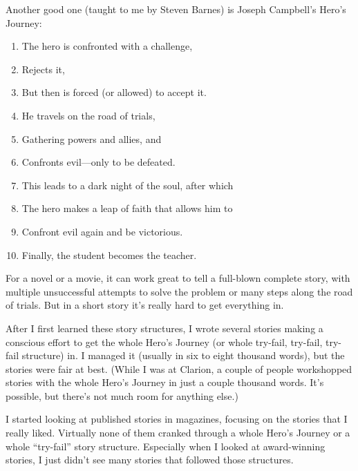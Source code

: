 \documentclass[openleft,oneside,showtrims]{memoir}
\begin{document}
Another good one (taught to me by Steven Barnes) is Joseph Campbell’s Hero’s Journey:

\begin{enumerate}
\item The hero is confronted with a challenge,

\item Rejects it,

\item But then is forced (or allowed) to accept it.

\item He travels on the road of trials,

\item Gathering powers and allies, and

\item Confronts evil—only to be defeated.

\item This leads to a dark night of the soul, after which

\item The hero makes a leap of faith that allows him to

\item Confront evil again and be victorious.

\item Finally, the student becomes the teacher.
\end{enumerate}

For a novel or a movie, it can work great to tell a full-blown complete story, with multiple unsuccessful attempts to solve the problem or many steps along the road of trials. But in a short story it’s really hard to get everything in.

After I first learned these story structures, I wrote several stories making a conscious effort to get the whole Hero’s Journey (or whole try-fail, try-fail, try-fail structure) in. I managed it (usually in six to eight thousand words), but the stories were fair at best. (While I was at Clarion, a couple of people workshopped stories with the whole Hero’s Journey in just a couple thousand words. It’s possible, but there’s not much room for anything else.)

I started looking at published stories in magazines, focusing on the stories that I really liked. Virtually none of them cranked through a whole Hero’s Journey or a whole “try-fail” story structure. Especially when I looked at award-winning stories, I just didn’t see many stories that followed those structures.
\end{document}
